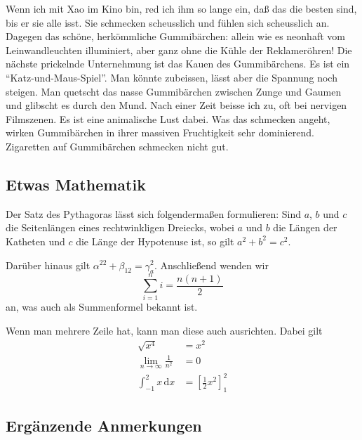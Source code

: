 \documentclass{scrartcl}
\begin{document}
  Wenn ich mit Xao im Kino bin, red ich ihm so lange ein, daß das die besten sind, bis er sie alle isst. Sie schmecken scheusslich und fühlen sich scheusslich an. Dagegen das schöne, herkömmliche Gummibärchen: allein wie es neonhaft vom Leinwandleuchten illuminiert, aber ganz ohne die Kühle der Reklameröhren! Die nächste prickelnde Unternehmung ist das Kauen des Gummibärchens. Es ist ein \enquote{Katz-und-Maus-Spiel}. Man könnte zubeissen, lässt aber die Spannung noch steigen. Man quetscht das nasse Gummibärchen zwischen Zunge und Gaumen und glibscht es durch den Mund. Nach einer Zeit beisse ich zu, oft bei nervigen Filmszenen. Es ist eine animalische Lust dabei. Was das schmecken angeht, wirken Gummibärchen in ihrer massiven Fruchtigkeit sehr dominierend. Zigaretten auf Gummibärchen schmecken nicht gut.

  \subsection{Etwas Mathematik}

  Der Satz des Pythagoras lässt sich folgendermaßen formulieren: Sind $a$, $b$ und $c$ die Seitenlängen eines rechtwinkligen Dreiecks, wobei $a$ und $b$ die Längen der Katheten und $c$ die Länge der Hypotenuse ist, so gilt $a^2 + b^2 = c^2$.

  Darüber hinaus gilt $\alpha^{22} + \beta_{12} = \gamma^2_a$. Anschließend wenden wir
  \[ \sum^n_{i=1}i = \frac{n(n+1)}2 \]
  an, was auch als Summenformel bekannt ist.

  Wenn man mehrere Zeile hat, kann man diese auch ausrichten. Dabei gilt
  \begin{align*}
    \sqrt{x^4} &= x^2\\
    \lim_{n\to\infty} \frac 1{n^2} &= 0 \\
    \int_{-1}^2 x\, \mathrm{d}x &= \left[ \frac12 x^2 \right]_1^2
  \end{align*}

  \subsection{Ergänzende Anmerkungen}
\end{document}
